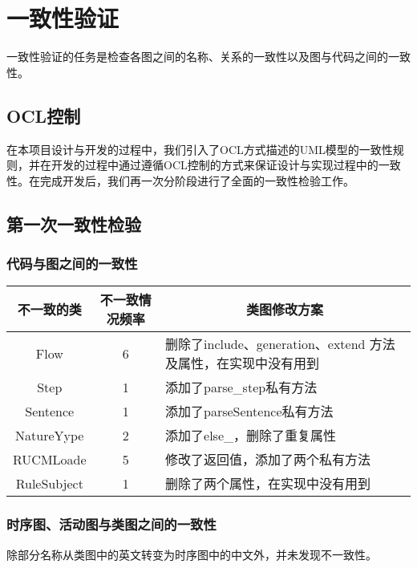\chapter{一致性验证}
一致性验证的任务是检查各图之间的名称、关系的一致性以及图与代码之间的一致性。

\section{OCL控制}
在本项目设计与开发的过程中，我们引入了OCL方式描述的UML模型的一致性规则，并在开发的过程中通过遵循OCL控制的方式来保证设计与实现过程中的一致性。在完成开发后，我们再一次分阶段进行了全面的一致性检验工作。

\section{第一次一致性检验}

\subsection{代码与图之间的一致性}
\begin{table}[htbp]
    \begin{tabular}{|c|c|l|}
    \hline
    不一致的类       & 不一致情况频率 & \multicolumn{1}{c|}{类图修改方案}                 \\ \hline
    Flow        & 6       & 删除了include、generation、extend 方法及属性，在实现中没有用到 \\ \hline
    Step        & 1       & 添加了parse\_step私有方法                          \\ \hline
    Sentence    & 1       & 添加了parseSentence私有方法                        \\ \hline
    NatureYype  & 2       & 添加了else\_，删除了重复属性                           \\ \hline
    RUCMLoade   & 5       & 修改了返回值，添加了两个私有方法                            \\ \hline
    RuleSubject & 1       & 删除了两个属性，在实现中没有用到                            \\ \hline
    \end{tabular}
    \end{table}
\subsection{时序图、活动图与类图之间的一致性}
除部分名称从类图中的英文转变为时序图中的中文外，并未发现不一致性。
